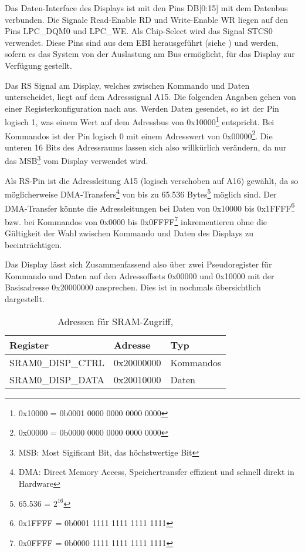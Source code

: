 Das Daten-Interface des Displays ist mit den Pins DB[0:15] mit dem Datenbus verbunden. Die Signale Read-Enable RD und Write-Enable WR liegen auf den Pins LPC\_DQM0 und LPC\_WE. Als Chip-Select wird das Signal STCS0 verwendet. Diese Pins sind aus dem EBI herausgeführt (siehe ) und werden, sofern es das System von der Auslastung am Bus ermöglicht, für das Display zur Verfügung gestellt.

Das RS Signal am Display, welches zwischen Kommando und Daten unterscheidet, liegt auf dem Adresssignal A15. Die folgenden Angaben gehen von einer Registerkonfiguration nach  aus. Werden Daten gesendet, so ist der Pin logisch 1, was einem Wert auf dem Adressbus von 0x10000\footnote{0x10000 = 0b0001 0000 0000 0000 0000} entspricht. Bei Kommandos ist der Pin logisch 0 mit einem Adresswert von 0x00000\footnote{0x00000 = 0b0000 0000 0000 0000 0000}. Die unteren 16 Bits des Adressraums lassen sich also willkürlich verändern, da nur das MSB\footnote{MSB: Most Sigificant Bit, das höchstwertige Bit} vom Display verwendet wird. 

Als RS-Pin ist die Adressleitung A15 (logisch verschoben auf A16) gewählt, da so möglicherweise DMA-Transfers\footnote{DMA: Direct Memory Access, Speichertransfer effizient und schnell direkt in Hardware} von bis zu 65.536 Bytes\footnote{65.536 = $2^{16}$} möglich sind. Der DMA-Transfer könnte die Adressleitungen bei Daten von 0x10000 bis 0x1FFFF\footnote{0x1FFFF = 0b0001 1111 1111 1111 1111} bzw. bei Kommandos von 0x0000 bis 0x0FFFF\footnote{0x0FFFF = 0b0000 1111 1111 1111 1111} inkrementieren ohne die Gültigkeit der Wahl zwischen Kommando und Daten des Displays zu beeinträchtigen.

Das Display lässt sich Zusammenfassend also über zwei Pseudoregister für Kommando und Daten auf den Adressoffsets 0x00000 und 0x10000 mit der Basisadresse 0x20000000 ansprechen. Dies ist in  nochmals übersichtlich dargestellt.

\begin{table}[h]
\begin{tabular}{|p{4.5cm}|p{4cm}|p{4cm}|}\hline
\rowcolor{TableBackgroundColor} 
	\textbf{Register} 	& \textbf{Adresse} 	& \textbf{Typ} 			\\ \hline
	SRAM0\_DISP\_CTRL 	& 0x20000000		& Kommandos				\\ \hline
	SRAM0\_DISP\_DATA 	& 0x20010000 		& Daten 				\\ \hline
\end{tabular}
\caption{Adressen für SRAM-Zugriff, \cite{NXP2010}}
\label{tab:sram_adressen}
\end{table}


